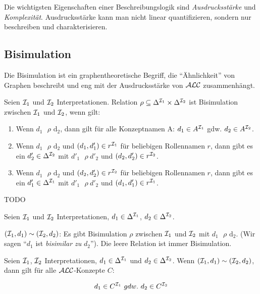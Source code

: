 Die wichtigsten Eigenschaften einer Beschreibungslogik sind
\emph{Ausdrucksstärke} und \emph{Komplexität}. Ausdrucksstärke kann man nicht
linear quantifizieren, sondern nur beschreiben und charakterisieren.

\subsection{Bisimulation}\label{bisimulation}

Die Bisimulation ist ein graphentheoretische Begriff, die \enquote{Ähnlichkeit} von Graphen beschreibt und eng mit der Ausdrucksstärke von $\mathcal{A}\mathcal{L}\mathcal{C}$ zusammenhängt.

\begin{definition}[Bisimulation]

Seien $\mathcal{I}_1$ und $\mathcal{I}_2$ Interpretationen. Relation
$\rho \subseteq \Delta^{\mathcal{I}_1} \times \Delta^{\mathcal{I}_2}$ ist Bisimulation
zwischen $\mathcal{I}_1$ und $\mathcal{I}_2$, wenn gilt:

\begin{enumerate}
\def\labelenumi{\arabic{enumi}.}
\item
  Wenn $d_1\text{\ $\rho$}\text{\ d}_2$, dann gilt für alle
  Konzeptnamen A: $d_1 \in A^{\mathcal{I}_1}$ gdw. $d_2 \in A^{\mathcal{I}_2}$.
\item
  Wenn $d_1\text{\ $\rho$}\text{\ d}_2$ und
  $\left( d_1,d_1' \right) \in r^{\MI_1}$ für beliebigen
  Rollennamen $r$, dann gibt es ein $d_2' \in \Delta^{\mathcal{I}_2}$
  mit ${d'}_1\text{\ $\rho$}{\ d'}_2$ und
  $\left( d_2,d_2' \right) \in r^{\MI_2}$.
\item
  Wenn $d_1\text{\ $\rho$}\text{\ d}_2$ und
  $\left( d_2,d_2' \right) \in r^{\MI_2}$ für beliebigen
  Rollennamen $r$, dann gibt es ein $d_1' \in \Delta^{\mathcal{I}_1}$
  mit ${d'}_1\text{\ $\rho$}{\ d'}_2$ und
  $\left( d_1,d_1' \right) \in r^{\MI_1}$.
\end{enumerate}
\end{definition}

\begin{tafel}[TODO]
    TODO
\end{tafel}

Seien $\mathcal{I}_1$ und $\mathcal{I}_2$ Interpretationen,
$d_1 \in \Delta^{\mathcal{I}_1}$, $d_2 \in \Delta^{\mathcal{I}_2}$.

$(\mathcal{I}_1,d_1) \sim (\mathcal{I}_2,d_2)$: Es gibt Bisimulation $\rho$
zwischen $\mathcal{I}_1$ und $\mathcal{I}_2$ mit $d_1\text{\ $\rho$}\text{\ d}_2$. (Wir sagen \enquote{$d_1$ ist \emph{bisimilar zu} $d_2$}).
Die leere Relation ist immer Bisimulation.

\begin{theorem}[Bisimulationstheorem]
    \label{thm:bisim}
Seien $\mathcal{I}_1$, $\mathcal{I}_2$ Interpretationen,
$d_1 \in \Delta^{\mathcal{I}_1}$ und $d_2 \in \Delta^{\mathcal{I}_2}$. Wenn
$(\mathcal{I}_1,d_1) \sim (\mathcal{I}_2,d_2)$, dann gilt für alle $\mathcal{A}\mathcal{L}\mathcal{C}$-Konzepte
$C$:

$$d_1 \in C^{\mathcal{I}_1}\ gdw.\ d_2 \in C^{\mathcal{I}_2}$$
\end{theorem}

